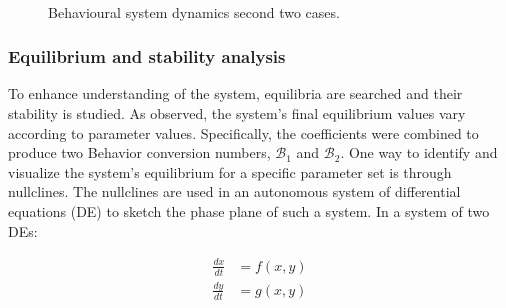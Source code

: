 \begin{figure}[h]
	\centering
	 \quad
	 \\
		\caption[Behavioural model simulation second]{Behavioural system dynamics second two cases.}
	\label{fig:model__behavior_sim_2}
\end{figure}

\subsubsection{Equilibrium and stability analysis}
To enhance understanding of the system, equilibria are searched and their stability is studied. As observed, the system’s final equilibrium values vary according to parameter values. Specifically, the coefficients were combined to produce two Behavior conversion numbers, $\mathcal{B}_1$ and $\mathcal{B}_2$. One way to identify and visualize the system’s equilibrium for a specific parameter set is through nullclines.
The nullclines are used in an autonomous system of differential equations (DE)  to sketch the phase plane of such a system. In a system of two DEs: 
  
\begin{align}
	\frac{dx}{dt} &= f(x,y) \\
	\frac{dy}{dt} &= g(x,y)
\end{align}

